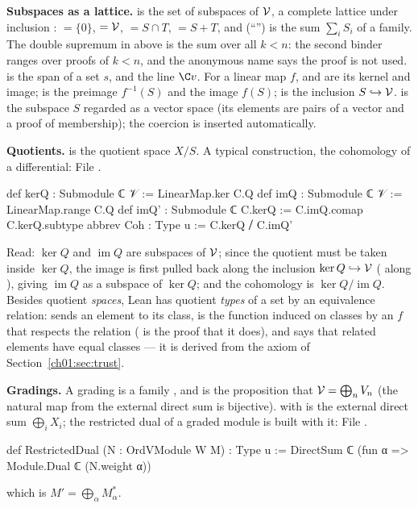 \textbf{Subspaces as a lattice.}  is the set of subspaces of $\mathcal{V}$, a complete
lattice under inclusion :  $=\{0\}$,  $=\mathcal{V}$,  $=S\cap T$,
 $=S+T$, and  (``'') is the sum $\sum_iS_i$ of a family.
The double supremum  in  above is the sum over all
$k<n$: the second binder ranges over proofs of $k<n$, and the anonymous name \lean{_} says the proof
is not used.  is the span of a set $s$, and  the line $\C v$.
For a linear map $f$,  and  are its kernel and image;
 is the preimage $f^{-1}(S)$ and  the image $f(S)$; 
is the inclusion $S\hookrightarrow\mathcal{V}$.  is the subspace $S$ regarded as a vector space
(its elements are pairs of a vector and a proof of membership); the coercion is inserted
automatically.

\textbf{Quotients.}  is the quotient space $X/S$. A typical construction, the cohomology
of a differential:
\noindent File .
\begin{leancode}
def kerQ : Submodule ℂ 𝒱 := LinearMap.ker C.Q
def imQ : Submodule ℂ 𝒱 := LinearMap.range C.Q
def imQ' : Submodule ℂ C.kerQ := C.imQ.comap C.kerQ.subtype
abbrev Coh : Type u := C.kerQ ⧸ C.imQ'
\end{leancode}
Read: $\ker Q$ and $\operatorname{im}Q$ are subspaces of $\mathcal{V}$; since the quotient must be taken
inside $\ker Q$, the image is first pulled back along the inclusion $\ker Q\hookrightarrow\mathcal{V}$
( along ), giving $\operatorname{im}Q$ as a subspace of $\ker Q$; and the
cohomology is $\ker Q/\operatorname{im}Q$.
Besides quotient \emph{spaces}, Lean has quotient \emph{types} of a set by an equivalence relation:
 sends an element to its class,  is the function induced on
classes by an $f$ that respects the relation ( is the proof that it does), and
 says that related elements have equal classes --- it is derived from the axiom
 of Section~\ref{ch01:sec:trust}.

\textbf{Gradings.} A grading is a family , and
 is the proposition that $\mathcal{V} = \bigoplus_nV_n$ (the natural map
from the external direct sum is bijective).  with  is the
external direct sum $\bigoplus_iX_i$; the restricted dual of a graded module is built with it:
\noindent File .
\begin{leancode}
def RestrictedDual (N : OrdVModule W M) : Type u := DirectSum ℂ (fun α => Module.Dual ℂ (N.weight α))
\end{leancode}
which is $M' = \bigoplus_\alpha M_\alpha^*$.

